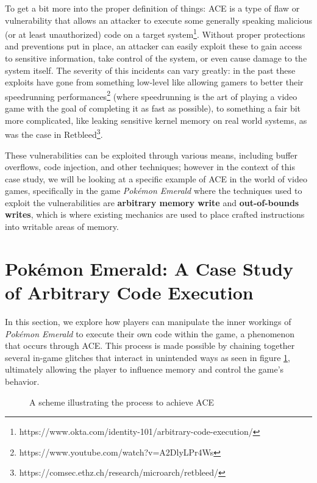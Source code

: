 \documentclass[a4paper]{usiinfbachelorproject}
\begin{document}
To get a bit more into the proper definition of things: ACE is a type of flaw or vulnerability that allows an attacker to execute some generally speaking malicious (or at least unauthorized) code on a target system\footnote{https://www.okta.com/identity-101/arbitrary-code-execution/}. Without proper protections and preventions put in place, an attacker can easily exploit these to gain access to sensitive information, take control of the system, or even cause damage to the system itself. The severity of this incidents can vary greatly: in the past these exploits have gone from something low-level like allowing gamers to better their speedrunning performances\footnote{https://www.youtube.com/watch?v=A2DlyLPr4Ws} (where speedrunning is the art of playing a video game with the goal of completing it as fast as possible), to something a fair bit more complicated, like leaking sensitive kernel memory on real world systems, as was the case in Retbleed\footnote{https://comsec.ethz.ch/research/microarch/retbleed/}.

These vulnerabilities can be exploited through various means, including buffer overflows, code injection, and other techniques; however in the context of this case study, we will be looking at a specific example of ACE in the world of video games, specifically in the game \textit{Pokémon Emerald} where the techniques used to exploit the vulnerabilities are \textbf{arbitrary memory write} and \textbf{out-of-bounds writes}, which is where existing mechanics are used to place crafted instructions into writable areas of memory.




\section{Pokémon Emerald: A Case Study of Arbitrary Code Execution}
\label{sec:case_study}
In this section, we explore how players can manipulate the inner workings of \textit{Pokémon Emerald} to execute their own code within the game, a phenomenon that occurs through ACE. This process is made possible by chaining together several in-game glitches that interact in unintended ways as seen in figure \ref{fig:ace_scheme}, ultimately allowing the player to influence memory and control the game’s behavior.

\begin{figure}[h!]
	\caption{A scheme illustrating the process to achieve ACE}\label{fig:ace_scheme}
\end{figure}
\end{document}
